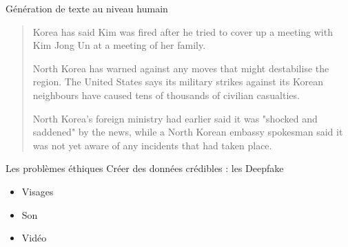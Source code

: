 \begin{frame}{Génération de texte au niveau humain}
\begin{quote}
    Korea has said Kim was fired after he tried to cover up a meeting with Kim Jong Un at a meeting of her family.
    
    North Korea has warned against any moves that might destabilise the region. The United States says its military strikes against its Korean neighbours have caused tens of thousands of civilian casualties.
    
    North Korea's foreign ministry had earlier said it was "shocked and saddened" by the news, while a North Korean embassy spokesman said it was not yet aware of any incidents that had taken place.
  \end{quote}
\end{frame}

\begin{frame}{Les problèmes éthiques}
  Créer des données crédibles : les Deepfake 
  \begin{itemize}
    \item Visages
    \item Son
    \item Vidéo 
  \end{itemize}
\end{frame}

